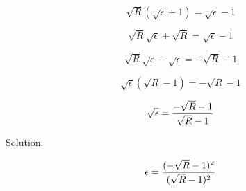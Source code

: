 $$\sqrt{R} (\sqrt{\epsilon} + 1) = \sqrt{\epsilon} - 1$$

$$\sqrt{R} \sqrt{\epsilon} + \sqrt{R} = \sqrt{\epsilon} - 1$$

$$\sqrt{R} \sqrt{\epsilon} - \sqrt{\epsilon} = - \sqrt{R} - 1$$

$$\sqrt{\epsilon} (\sqrt{R} - 1) = - \sqrt{R} - 1$$

$$\sqrt{\epsilon} =  {- \sqrt{R} - 1 \over \sqrt{R} - 1}$$

Solution:

$$\epsilon = {(-\sqrt{R} - 1)^2 \over (\sqrt{R} - 1)^2}$$











